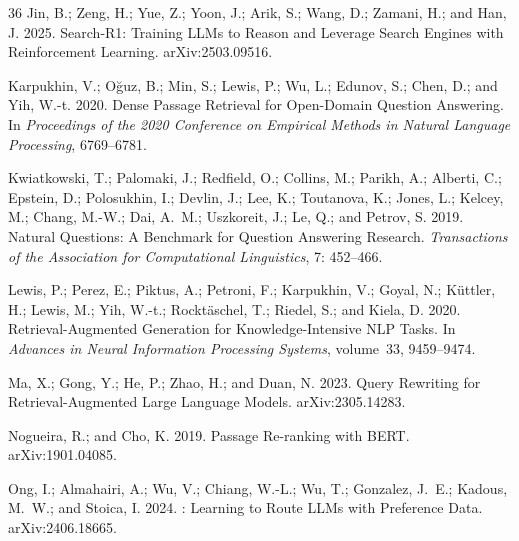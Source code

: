 \begin{thebibliography}{36}
Jin, B.; Zeng, H.; Yue, Z.; Yoon, J.; Arik, S.; Wang, D.; Zamani, H.; and Han, J. 2025.
\newblock Search-R1: Training {LLMs} to Reason and Leverage Search Engines with Reinforcement Learning.
\newblock arXiv:2503.09516.

Karpukhin, V.; O{\u{g}}uz, B.; Min, S.; Lewis, P.; Wu, L.; Edunov, S.; Chen, D.; and Yih, W.-t. 2020.
\newblock Dense Passage Retrieval for Open-Domain Question Answering.
\newblock In \emph{Proceedings of the 2020 Conference on Empirical Methods in Natural Language Processing}, 6769--6781.

Kwiatkowski, T.; Palomaki, J.; Redfield, O.; Collins, M.; Parikh, A.; Alberti, C.; Epstein, D.; Polosukhin, I.; Devlin, J.; Lee, K.; Toutanova, K.; Jones, L.; Kelcey, M.; Chang, M.-W.; Dai, A.~M.; Uszkoreit, J.; Le, Q.; and Petrov, S. 2019.
\newblock Natural Questions: A Benchmark for Question Answering Research.
\newblock \emph{Transactions of the Association for Computational Linguistics}, 7: 452--466.

Lewis, P.; Perez, E.; Piktus, A.; Petroni, F.; Karpukhin, V.; Goyal, N.; K{\"u}ttler, H.; Lewis, M.; Yih, W.-t.; Rockt{\"a}schel, T.; Riedel, S.; and Kiela, D. 2020.
\newblock Retrieval-Augmented Generation for Knowledge-Intensive {NLP} Tasks.
\newblock In \emph{Advances in Neural Information Processing Systems}, volume~33, 9459--9474.

Ma, X.; Gong, Y.; He, P.; Zhao, H.; and Duan, N. 2023.
\newblock Query Rewriting for Retrieval-Augmented Large Language Models.
\newblock arXiv:2305.14283.

Nogueira, R.; and Cho, K. 2019.
\newblock Passage Re-ranking with {BERT}.
\newblock arXiv:1901.04085.

Ong, I.; Almahairi, A.; Wu, V.; Chiang, W.-L.; Wu, T.; Gonzalez, J.~E.; Kadous, M.~W.; and Stoica, I. 2024.
: Learning to Route {LLMs} with Preference Data.
\newblock arXiv:2406.18665.


\end{thebibliography}
